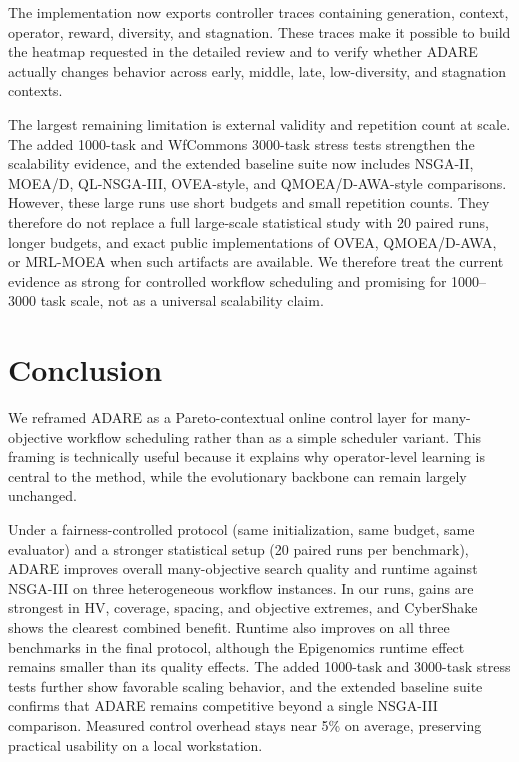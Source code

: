 \documentclass[runningheads]{llncs}
\begin{document}
The implementation now exports controller traces containing generation, context, operator, reward, diversity, and stagnation. These traces make it possible to build the heatmap requested in the detailed review and to verify whether ADARE actually changes behavior across early, middle, late, low-diversity, and stagnation contexts.

The largest remaining limitation is external validity and repetition count at scale. The added 1000-task and WfCommons 3000-task stress tests strengthen the scalability evidence, and the extended baseline suite now includes NSGA-II, MOEA/D, QL-NSGA-III, OVEA-style, and QMOEA/D-AWA-style comparisons. However, these large runs use short budgets and small repetition counts. They therefore do not replace a full large-scale statistical study with 20 paired runs, longer budgets, and exact public implementations of OVEA, QMOEA/D-AWA, or MRL-MOEA when such artifacts are available. We therefore treat the current evidence as strong for controlled workflow scheduling and promising for 1000--3000 task scale, not as a universal scalability claim.
\section{Conclusion}
We reframed ADARE as a Pareto-contextual online control layer for many-objective workflow scheduling rather than as a simple scheduler variant. This framing is technically useful because it explains why operator-level learning is central to the method, while the evolutionary backbone can remain largely unchanged.

Under a fairness-controlled protocol (same initialization, same budget, same evaluator) and a stronger statistical setup (20 paired runs per benchmark), ADARE improves overall many-objective search quality and runtime against NSGA-III on three heterogeneous workflow instances. In our runs, gains are strongest in HV, coverage, spacing, and objective extremes, and CyberShake shows the clearest combined benefit. Runtime also improves on all three benchmarks in the final protocol, although the Epigenomics runtime effect remains smaller than its quality effects. The added 1000-task and 3000-task stress tests further show favorable scaling behavior, and the extended baseline suite confirms that ADARE remains competitive beyond a single NSGA-III comparison. Measured control overhead stays near 5\% on average, preserving practical usability on a local workstation.
\end{document}
